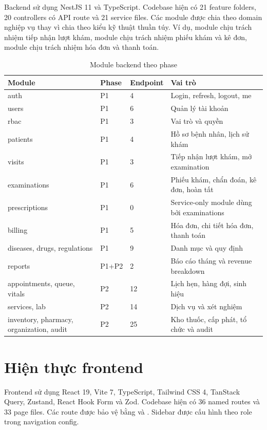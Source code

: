 Backend sử dụng NestJS 11 và TypeScript. Codebase hiện có 21 feature folders, 20 controllers có API route và 21 service files. Các module được chia theo domain nghiệp vụ thay vì chia theo kiểu kỹ thuật thuần túy. Ví dụ, module  chịu trách nhiệm tiếp nhận lượt khám, module  chịu trách nhiệm phiếu khám và kê đơn, module  chịu trách nhiệm hóa đơn và thanh toán.

\begin{longtable}{|p{3.2cm}|p{2cm}|p{2.5cm}|p{6cm}|}
\caption{Module backend theo phase}\\
\hline
\textbf{Module} & \textbf{Phase} & \textbf{Endpoint} & \textbf{Vai trò} \\
\hline
auth & P1 & 4 & Login, refresh, logout, me \\
\hline
users & P1 & 6 & Quản lý tài khoản \\
\hline
rbac & P1 & 3 & Vai trò và quyền \\
\hline
patients & P1 & 4 & Hồ sơ bệnh nhân, lịch sử khám \\
\hline
visits & P1 & 3 & Tiếp nhận lượt khám, mở examination \\
\hline
examinations & P1 & 6 & Phiếu khám, chẩn đoán, kê đơn, hoàn tất \\
\hline
prescriptions & P1 & 0 & Service-only module dùng bởi examinations \\
\hline
billing & P1 & 5 & Hóa đơn, chi tiết hóa đơn, thanh toán \\
\hline
diseases, drugs, regulations & P1 & 9 & Danh mục và quy định \\
\hline
reports & P1+P2 & 2 & Báo cáo tháng và revenue breakdown \\
\hline
appointments, queue, vitals & P2 & 12 & Lịch hẹn, hàng đợi, sinh hiệu \\
\hline
services, lab & P2 & 14 & Dịch vụ và xét nghiệm \\
\hline
inventory, pharmacy, organization, audit & P2 & 25 & Kho thuốc, cấp phát, tổ chức và audit \\
\hline
\end{longtable}

\section{Hiện thực frontend}

Frontend sử dụng React 19, Vite 7, TypeScript, Tailwind CSS 4, TanStack Query, Zustand, React Hook Form và Zod. Codebase hiện có 36 named routes và 33 page files. Các route được bảo vệ bằng  và . Sidebar được cấu hình theo role trong navigation config.


